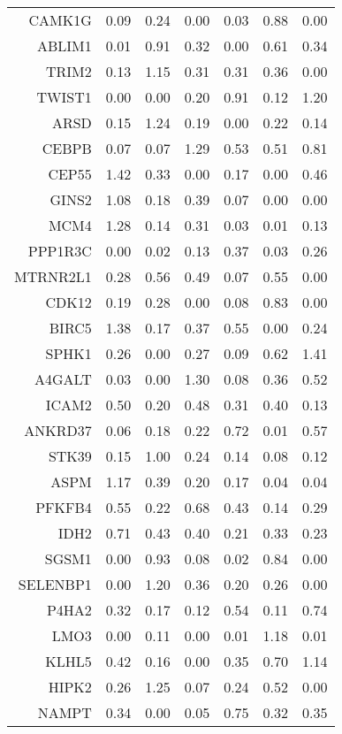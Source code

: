 \begin{longtable}{rrrrrrr}
  CAMK1G & 0.09 & 0.24 & 0.00 & 0.03 & 0.88 & 0.00 \\ 
  ABLIM1 & 0.01 & 0.91 & 0.32 & 0.00 & 0.61 & 0.34 \\ 
  TRIM2 & 0.13 & 1.15 & 0.31 & 0.31 & 0.36 & 0.00 \\ 
  TWIST1 & 0.00 & 0.00 & 0.20 & 0.91 & 0.12 & 1.20 \\ 
  ARSD & 0.15 & 1.24 & 0.19 & 0.00 & 0.22 & 0.14 \\ 
  CEBPB & 0.07 & 0.07 & 1.29 & 0.53 & 0.51 & 0.81 \\ 
  CEP55 & 1.42 & 0.33 & 0.00 & 0.17 & 0.00 & 0.46 \\ 
  GINS2 & 1.08 & 0.18 & 0.39 & 0.07 & 0.00 & 0.00 \\ 
  MCM4 & 1.28 & 0.14 & 0.31 & 0.03 & 0.01 & 0.13 \\ 
  PPP1R3C & 0.00 & 0.02 & 0.13 & 0.37 & 0.03 & 0.26 \\ 
  MTRNR2L1 & 0.28 & 0.56 & 0.49 & 0.07 & 0.55 & 0.00 \\ 
  CDK12 & 0.19 & 0.28 & 0.00 & 0.08 & 0.83 & 0.00 \\ 
  BIRC5 & 1.38 & 0.17 & 0.37 & 0.55 & 0.00 & 0.24 \\ 
  SPHK1 & 0.26 & 0.00 & 0.27 & 0.09 & 0.62 & 1.41 \\ 
  A4GALT & 0.03 & 0.00 & 1.30 & 0.08 & 0.36 & 0.52 \\ 
  ICAM2 & 0.50 & 0.20 & 0.48 & 0.31 & 0.40 & 0.13 \\ 
  ANKRD37 & 0.06 & 0.18 & 0.22 & 0.72 & 0.01 & 0.57 \\ 
  STK39 & 0.15 & 1.00 & 0.24 & 0.14 & 0.08 & 0.12 \\ 
  ASPM & 1.17 & 0.39 & 0.20 & 0.17 & 0.04 & 0.04 \\ 
  PFKFB4 & 0.55 & 0.22 & 0.68 & 0.43 & 0.14 & 0.29 \\ 
  IDH2 & 0.71 & 0.43 & 0.40 & 0.21 & 0.33 & 0.23 \\ 
  SGSM1 & 0.00 & 0.93 & 0.08 & 0.02 & 0.84 & 0.00 \\ 
  SELENBP1 & 0.00 & 1.20 & 0.36 & 0.20 & 0.26 & 0.00 \\ 
  P4HA2 & 0.32 & 0.17 & 0.12 & 0.54 & 0.11 & 0.74 \\ 
  LMO3 & 0.00 & 0.11 & 0.00 & 0.01 & 1.18 & 0.01 \\ 
  KLHL5 & 0.42 & 0.16 & 0.00 & 0.35 & 0.70 & 1.14 \\ 
  HIPK2 & 0.26 & 1.25 & 0.07 & 0.24 & 0.52 & 0.00 \\ 
  NAMPT & 0.34 & 0.00 & 0.05 & 0.75 & 0.32 & 0.35 \\ 

\end{longtable}

